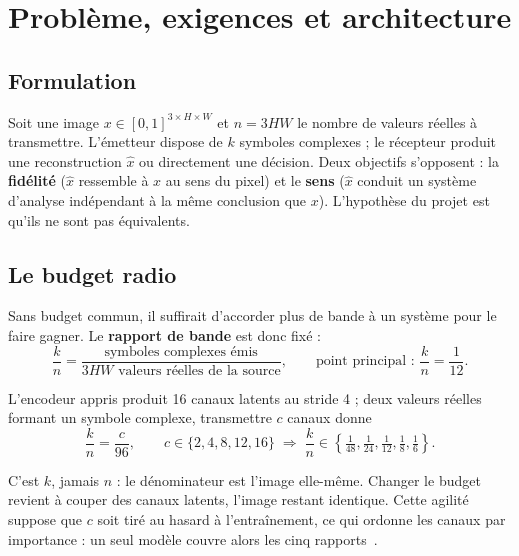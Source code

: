\chapter{Problème, exigences et architecture}
\label{chap:architecture}

\section{Formulation}
\label{sec:formulation}

Soit une image $x \in [0,1]^{3\times H\times W}$ et $n = 3HW$ le nombre de valeurs réelles à transmettre.
L'émetteur dispose de $k$ symboles complexes ; le récepteur produit une reconstruction $\hat{x}$ ou
directement une décision. Deux objectifs s'opposent : la \textbf{fidélité} ($\hat{x}$ ressemble à $x$ au sens
du pixel) et le \textbf{sens} ($\hat{x}$ conduit un système d'analyse indépendant à la même conclusion que
$x$). L'hypothèse du projet est qu'ils ne sont pas équivalents.

\section{Le budget radio}
\label{sec:budget}

Sans budget commun, il suffirait d'accorder plus de bande à un système pour le faire gagner. Le
\textbf{rapport de bande} est donc fixé :
\begin{equation}
  \frac{k}{n} = \frac{\text{symboles complexes émis}}{3HW \text{ valeurs réelles de la source}},
  \qquad \text{point principal : } \frac{k}{n} = \frac{1}{12}.
  \label{eq:kn}
\end{equation}

L'encodeur appris produit 16 canaux latents au stride 4 ; deux valeurs réelles formant un symbole complexe,
transmettre $c$ canaux donne
\begin{equation}
  \frac{k}{n} = \frac{c}{96}, \qquad c \in \{2,4,8,12,16\} \;\Longrightarrow\; \frac{k}{n} \in
  \left\{\tfrac{1}{48}, \tfrac{1}{24}, \tfrac{1}{12}, \tfrac{1}{8}, \tfrac{1}{6}\right\}.
  \label{eq:ratio_c}
\end{equation}

\begin{keybox}
C'est $k$, jamais $n$ : le dénominateur est l'image elle-même. Changer le budget revient à couper des canaux
latents, l'image restant identique. Cette agilité suppose que $c$ soit tiré au hasard à l'entraînement, ce qui
ordonne les canaux par importance : un seul modèle couvre alors les cinq rapports~\cite{kurka2021}.
\end{keybox}

